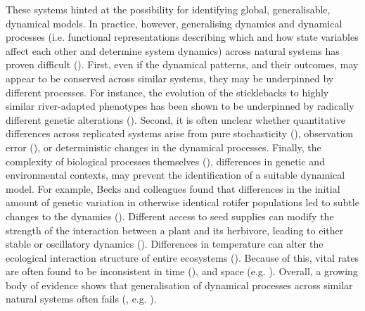 \documentclass[11pt, oneside]{article}
\begin{document}
These systems hinted at the possibility for identifying global, generalisable, dynamical models. 
In practice, however, generalising dynamics and dynamical processes (i.e. functional representations describing which and how state variables affect each other and determine system dynamics) across natural systems has proven difficult (\cite{Lawton1999}).
%
First, even if the dynamical patterns, and their outcomes, may appear to be conserved across similar systems, they may be underpinned by different processes. 
For instance, the evolution of the sticklebacks to highly similar river-adapted phenotypes has been shown to be underpinned by radically different genetic alterations (\cite{Raeymaekers2017}).
%
Second, it is often unclear whether quantitative differences across replicated systems arise from pure stochasticity (\cite{Dallas2021}), observation error (\cite{DeMeester2019}), or deterministic changes in the dynamical processes. 
%
Finally, the complexity of biological processes themselves (\cite{Adamson2013}), differences in genetic and environmental contexts, may prevent the identification of a suitable dynamical model.
For example, Becks and colleagues found that differences in the initial amount of genetic variation in otherwise identical rotifer populations led to subtle changes to the dynamics (\cite{Becks2010}).
Different access to seed supplies can modify the strength of the interaction between a plant and its herbivore, leading to either stable or oscillatory dynamics (\cite{Bonsall2003}).
Differences in temperature can alter the ecological interaction structure of entire ecosystems (\cite{Shurin2012,Bonnaffe2021b}).
Because of this, vital rates are often found to be inconsistent in time (\cite{Gross2005,Adamson2013}), and space (e.g. \cite{Gamelon2019}).
Overall, a growing body of evidence shows that generalisation of dynamical processes across similar natural systems often fails (\cite{Lawton1999}, e.g. \cite{Kendall2005, Demyanov2006, Ezard2009}).
\end{document}
